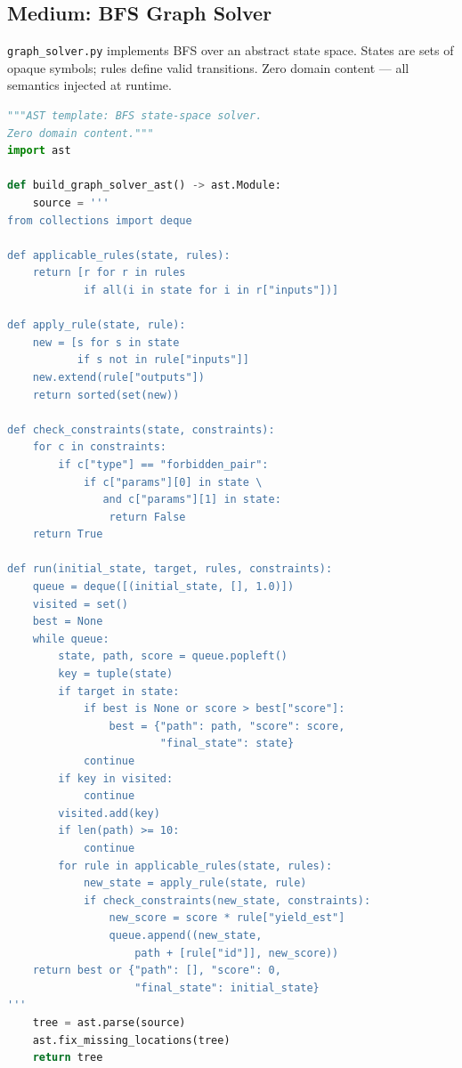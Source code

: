 \documentclass[letterpaper,11pt]{article}
\begin{document}
\subsection{Medium: BFS Graph Solver}\label{app:graph-solver}

\texttt{graph\_solver.py} implements BFS over an abstract state space.
States are sets of opaque symbols; rules define valid transitions.
Zero domain content --- all semantics injected at runtime.

\begin{lstlisting}[language=Python,caption={graph\_solver.py (43 lines)}]
"""AST template: BFS state-space solver.
Zero domain content."""
import ast

def build_graph_solver_ast() -> ast.Module:
    source = '''
from collections import deque

def applicable_rules(state, rules):
    return [r for r in rules
            if all(i in state for i in r["inputs"])]

def apply_rule(state, rule):
    new = [s for s in state
           if s not in rule["inputs"]]
    new.extend(rule["outputs"])
    return sorted(set(new))

def check_constraints(state, constraints):
    for c in constraints:
        if c["type"] == "forbidden_pair":
            if c["params"][0] in state \
               and c["params"][1] in state:
                return False
    return True

def run(initial_state, target, rules, constraints):
    queue = deque([(initial_state, [], 1.0)])
    visited = set()
    best = None
    while queue:
        state, path, score = queue.popleft()
        key = tuple(state)
        if target in state:
            if best is None or score > best["score"]:
                best = {"path": path, "score": score,
                        "final_state": state}
            continue
        if key in visited:
            continue
        visited.add(key)
        if len(path) >= 10:
            continue
        for rule in applicable_rules(state, rules):
            new_state = apply_rule(state, rule)
            if check_constraints(new_state, constraints):
                new_score = score * rule["yield_est"]
                queue.append((new_state,
                    path + [rule["id"]], new_score))
    return best or {"path": [], "score": 0,
                    "final_state": initial_state}
'''
    tree = ast.parse(source)
    ast.fix_missing_locations(tree)
    return tree
\end{lstlisting}
\end{document}
